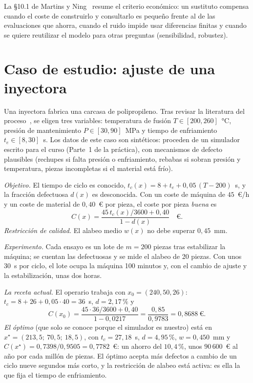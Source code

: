 La §10.1 de Martins y Ning~\cite{mn} resume el criterio económico: un sustituto compensa cuando el coste de construirlo y consultarlo es pequeño frente al de las evaluaciones que ahorra, cuando el ruido impide usar diferencias finitas y cuando se quiere reutilizar el modelo para otras preguntas (sensibilidad, robustez).

\section{Caso de estudio: ajuste de una inyectora}

\begin{ejemplo}\label{ej:inyectora}
Una inyectora fabrica una carcasa de polipropileno. Tras revisar la literatura del proceso~\cite{fernandes}, se eligen tres variables: temperatura de fusión $T\in[200,260]$~°C, presión de mantenimiento $P\in[30,90]$~MPa y tiempo de enfriamiento $t_e\in[8,30]$~s. Los datos de este caso son sintéticos: proceden de un simulador escrito para el curso (Parte~1 de la práctica), con mecanismos de defecto plausibles (rechupes si falta presión o enfriamiento, rebabas si sobran presión y temperatura, piezas incompletas si el material está frío).

\emph{Objetivo.} El tiempo de ciclo es conocido, $t_c(x)=8+t_e+0{,}05\,(T-200)$~s, y la fracción defectuosa $d(x)$ es desconocida. Con un coste de máquina de $45$~€/h y un coste de material de $0{,}40$~€ por pieza, el coste por pieza \emph{buena} es
\[
C(x)=\frac{45\,t_c(x)/3600+0{,}40}{1-d(x)}\quad\text{€}.
\]
\emph{Restricción de calidad.} El alabeo medio $w(x)$ no debe superar $0{,}45$~mm.

\emph{Experimento.} Cada ensayo es un lote de $m=200$ piezas tras estabilizar la máquina; se cuentan las defectuosas y se mide el alabeo de 20 piezas. Con unos 30~s por ciclo, el lote ocupa la máquina 100 minutos y, con el cambio de ajuste y la estabilización, unas dos horas.

\emph{La receta actual.} El operario trabaja con $x_0=(240,50,26)$: $t_c=8+26+0{,}05\cdot 40=36$~s, $d=2{,}17\,\%$ y
\[
C(x_0)=\frac{45\cdot 36/3600+0{,}40}{1-0{,}0217}=\frac{0{,}85}{0{,}9783}=0{,}8688\ \text{€}.
\]
\emph{El óptimo} (que solo se conoce porque el simulador es nuestro) está en $x^\star=(213{,}5;\ 70{,}5;\ 18{,}5)$, con $t_c=27{,}18$~s, $d=4{,}95\,\%$, $w=0{,}450$~mm y $C(x^\star)=0{,}7398/0{,}9505=0{,}7782$~€: un ahorro del $10{,}4\,\%$, unos $90\,600$~€ al año por cada millón de piezas. El óptimo acepta más defectos a cambio de un ciclo nueve segundos más corto, y la restricción de alabeo está activa: es ella la que fija el tiempo de enfriamiento.


\end{ejemplo}

